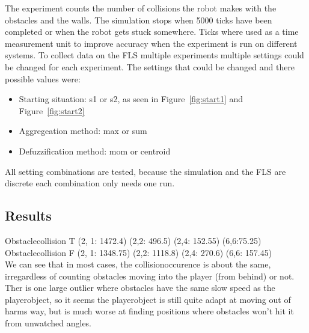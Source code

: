 \documentclass[conference]{IEEEtran}
\begin{document}
The experiment counts the number of collisions the robot makes with the obstacles and the walls. The simulation stops when 5000 ticks have been completed or when the robot gets stuck somewhere. Ticks where used as a time measurement unit to improve accuracy when the experiment is run on different systems. To collect data on the FLS multiple experiments multiple settings could be changed for each experiment. The settings that could be changed and there possible values were:
\begin{itemize}
  \item Starting situation: s1 or s2, as seen in Figure~\ref{fig:start1} and Figure~\ref{fig:start2}
  \item Aggregeation method: max or sum
  \item Defuzzification method: mom or centroid
\end{itemize}

All setting combinations are tested, because the simulation and the FLS are discrete each combination only needs one run.


\subsection{Results}
Obstaclecollision T (2, 1: 1472.4) (2,2: 496.5) (2,4: 152.55) (6,6:75.25)\\
Obstaclecollision F (2, 1: 1348.75) (2,2: 1118.8) (2,4: 270.6) (6,6: 157.45)\\

We can see that in most cases, the collisionoccurence is about the same, irregardless of counting obstacles moving into the player (from behind) or not. Ther is one large outlier where obstacles have the same slow speed as the playerobject, so it seems the playerobject is still quite adapt at moving out of harms way, but is much worse at finding positions where obstacles won't hit it from unwatched angles.
\end{document}
